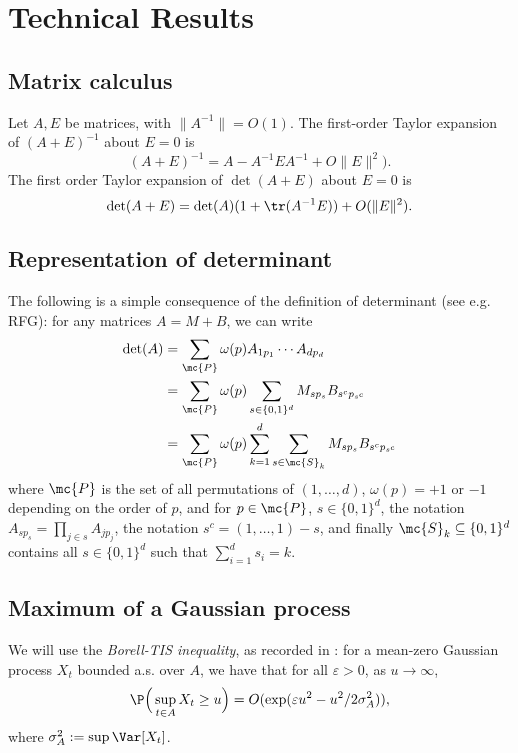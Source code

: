 \documentclass{article}
\begin{document}
	\section{Technical Results}
	
	\subsection{Matrix calculus}
	Let $A,E$ be matrices, with $\|A^{-1}\| = O(1)$. The first-order Taylor expansion of $(A + E)^{-1}$ about $E = 0$ is
	\begin{equation}
		\label{eqn:matrix-inverse-taylor-expansion}
		(A + E)^{-1} = A - A^{-1} E A^{-1} + O\|E\|^2).
	\end{equation}
	The first order Taylor expansion of $\det(A + E)$ about $E = 0$ is
	\begin{equation}
		\label{eqn:matrix-det-taylor-expansion}
		\det(A + E) = \det(A)(1 + \tr(A^{-1}E)) + O(\|E\|^2). 
	\end{equation}
	
	\subsection{Representation of determinant}
	The following is a simple consequence of the definition of determinant (see e.g. RFG): for any matrices $A = M + B$, we can write
	\begin{equation}
		\label{eqn:representation-determinant}
		\begin{aligned}
			\det(A) 
			& = \sum_{\mc{P}} \omega(p) A_{1p_1} \cdots A_{dp_d} \\
			& = \sum_{\mc{P}} \omega(p) \sum_{s \in \{0,1\}^d} M_{sp_s} B_{s^cp_{s^c}} \\
			& = \sum_{\mc{P}} \omega(p) \sum_{k = 1}^{d} \sum_{s \in \mc{S}_k} M_{sp_s} B_{s^cp_{s^c}}
		\end{aligned}
	\end{equation}
	where $\mc{P}$ is the set of all permutations of $(1,\ldots,d)$, $\omega(p) = +1$ or $-1$ depending on the order of $p$, and for $p \in \mc{P}$, $s \in \{0,1\}^d$, the notation $A_{sp_s} = \prod_{j \in s} A_{jp_j}$, the notation $s^c = (1,\ldots,1) - s$, and finally $\mc{S}_k \subseteq \{0,1\}^d$ contains all $s \in \{0,1\}^d$ such that $\sum_{i = 1}^{d} s_i = k$.
	
	\subsection{Maximum of a Gaussian process}
	We will use the \emph{Borell-TIS inequality}, as recorded in : for a mean-zero Gaussian process $X_t$ bounded a.s. over $A$, we have that for all $\varepsilon > 0$, as $u \to \infty$,
	\begin{equation}
		\label{eqn:borell-tis}
		\P\Big(\sup_{t \in A} X_t \geq u\Big) = O(\exp(\varepsilon u^2 - u^2/2\sigma_{A}^2)), 
	\end{equation}
	where $\sigma_{A}^2 := \sup \Var[X_t]$.  
	
\end{document}
